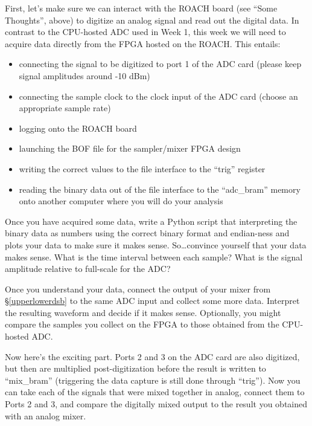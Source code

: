 \documentclass[11pt]{article}
\begin{document}
First, let's make sure we can interact with the ROACH board (see ``Some Thoughts'', above)
to digitize an analog signal and read out the digital data.  In contrast to the CPU-hosted ADC
used in Week 1, this week we will need to acquire data directly from the FPGA hosted on the ROACH.
This entails:
\begin{itemize}[noitemsep,nolistsep]
\item connecting the signal to be digitized to port 1 of the ADC card (please keep signal amplitudes around -10 dBm)
\item connecting the sample clock to the clock input of the ADC card (choose an appropriate sample rate)
\item logging onto the ROACH board
\item launching the BOF file for the sampler/mixer FPGA design
\item writing the correct values to the file interface to the ``trig'' register
\item reading the binary data out of the file interface to the ``adc\_bram'' memory onto another computer
where you will do your analysis
\end{itemize}

Once you have acquired some data, write a Python script that
interpreting the binary data as numbers using the correct binary format and endian-ness
and plots your data to make sure it makes sense.  So\dots convince yourself that your data
makes sense.  What is the time interval between each sample?  What is the signal amplitude
relative to full-scale for the ADC?

Once you understand your data, connect the output of your mixer from \S\ref{upperlowerdsb} to
the same ADC input and collect some more data.  Interpret the resulting waveform and decide if
it makes sense. Optionally, you might compare the samples you collect on the FPGA to those obtained from the CPU-hosted
ADC.  

Now here's the exciting part.  Ports 2 and 3 on the ADC card are also digitized, but then are multiplied
post-digitization before the result is written to ``mix\_bram'' (triggering the data capture is still
done through ``trig'').  Now you can take each of the signals
that were mixed together in analog, connect them to Ports 2 and 3, and compare the digitally mixed output
to the result you obtained with an analog mixer.
\end{document}
